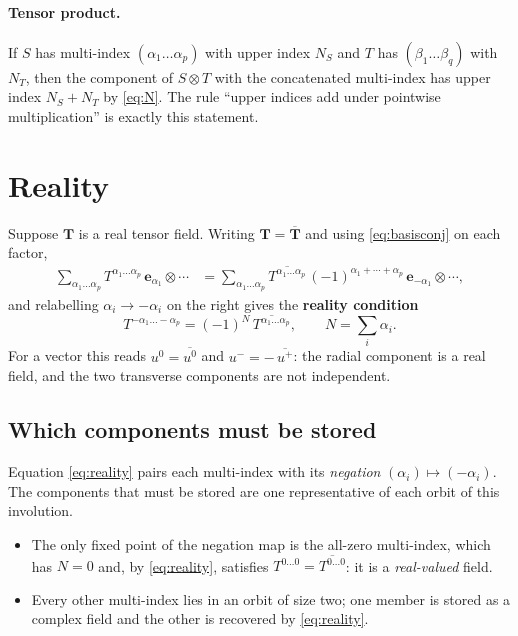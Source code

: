 \documentclass[11pt,a4paper]{article}
\newcommand{\ebasis}[1]{\mathbf{e}_{#1}}
\newcommand{\conj}[1]{\overline{#1}}
\begin{document}
\paragraph{Tensor product.}  If $S$ has multi-index
$(\alpha_1 \ldots \alpha_p)$ with upper index $N_S$ and $T$ has
$(\beta_1 \ldots \beta_q)$ with $N_T$, then the component of
$S \otimes T$ with the concatenated multi-index has upper index
$N_S + N_T$ by \eqref{eq:N}.  The rule ``upper indices add under
pointwise multiplication'' is exactly this statement.

\section{Reality}
\label{sec:reality}

Suppose $\mathbf{T}$ is a real tensor field.  Writing
$\mathbf{T} = \conj{\mathbf{T}}$ and using \eqref{eq:basisconj} on each
factor,
\begin{align}
  \sum_{\alpha_1 \ldots \alpha_p} T^{\alpha_1 \ldots \alpha_p}\,
    \ebasis{\alpha_1} \otimes \cdots
  &= \sum_{\alpha_1 \ldots \alpha_p} \conj{T^{\alpha_1 \ldots \alpha_p}}\,
     (-1)^{\alpha_1 + \cdots + \alpha_p}\,
     \ebasis{-\alpha_1} \otimes \cdots ,
\end{align}
and relabelling $\alpha_i \to -\alpha_i$ on the right gives the
\textbf{reality condition}
\begin{equation}
  \boxed{\;
  T^{-\alpha_1 \ldots -\alpha_p}
    = (-1)^{N}\, \conj{T^{\alpha_1 \ldots \alpha_p}},
  \qquad N = \textstyle\sum_i \alpha_i .
  \;}
  \label{eq:reality}
\end{equation}
For a vector this reads $u^{0} = \conj{u^{0}}$ and
$u^{-} = -\,\conj{u^{+}}$: the radial component is a real field, and the
two transverse components are not independent.

\subsection{Which components must be stored}
\label{sec:orbits}

Equation \eqref{eq:reality} pairs each multi-index with its
\emph{negation} $(\alpha_i) \mapsto (-\alpha_i)$.  The components that
must be stored are one representative of each orbit of this involution.

\begin{itemize}
  \item The only fixed point of the negation map is the all-zero
    multi-index, which has $N = 0$ and, by \eqref{eq:reality}, satisfies
    $T^{0\ldots 0} = \conj{T^{0 \ldots 0}}$: it is a \emph{real-valued}
    field.
  \item Every other multi-index lies in an orbit of size two; one member
    is stored as a complex field and the other is recovered by
    \eqref{eq:reality}.
\end{itemize}
\end{document}
